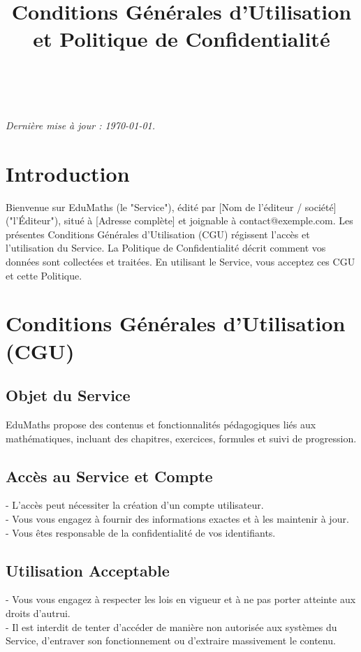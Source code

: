 \documentclass[12pt]{article}
\title{Conditions Générales d'Utilisation et Politique de Confidentialité\\\NomService}
\author{\NomEditeur}
\date{\DateDoc\\\VersionDoc}
\makeatletter
\newcommand{\NomService}{EduMaths}
\newcommand{\NomEditeur}{[Nom de l'éditeur / société]}
\newcommand{\ContactEmail}{contact@exemple.com}
\newcommand{\AdresseEditeur}{[Adresse complète]}
\newcommand{\DateDoc}{\today}
\makeatother
\begin{document}
\maketitle
\tableofcontents
\vspace{1em}
\noindent\textit{Dernière mise à jour : \DateDoc.}

\section{Introduction}
Bienvenue sur \NomService{} (le "Service"), édité par \NomEditeur{} ("l'Éditeur"), situé à \AdresseEditeur{} et joignable à \ContactEmail{}. Les présentes Conditions Générales d'Utilisation (CGU) régissent l'accès et l'utilisation du Service. La Politique de Confidentialité décrit comment vos données sont collectées et traitées. En utilisant le Service, vous acceptez ces CGU et cette Politique.

\section{Conditions Générales d'Utilisation (CGU)}
\subsection{Objet du Service}
\NomService{} propose des contenus et fonctionnalités pédagogiques liés aux mathématiques, incluant des chapitres, exercices, formules et suivi de progression.

\subsection{Accès au Service et Compte}
- L'accès peut nécessiter la création d'un compte utilisateur.\\
- Vous vous engagez à fournir des informations exactes et à les maintenir à jour.\\
- Vous êtes responsable de la confidentialité de vos identifiants.

\subsection{Utilisation Acceptable}
- Vous vous engagez à respecter les lois en vigueur et à ne pas porter atteinte aux droits d'autrui.\\
- Il est interdit de tenter d'accéder de manière non autorisée aux systèmes du Service, d'entraver son fonctionnement ou d'extraire massivement le contenu.
\end{document}
